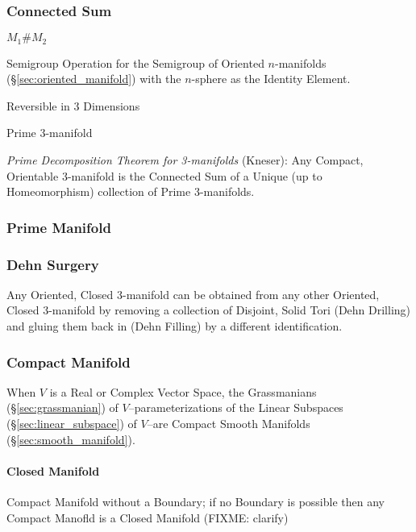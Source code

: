\subsubsection{Connected Sum}\label{sec:connected_sum}

$M_1 \# M_2$

Semigroup Operation for the Semigroup of Oriented $n$-manifolds
(\S\ref{sec:oriented_manifold}) with the $n$-sphere as the Identity Element.

Reversible in 3 Dimensions

Prime 3-manifold

\emph{Prime Decomposition Theorem for 3-manifolds} (Kneser): Any Compact,
Orientable 3-manifold is the Connected Sum of a Unique (up to Homeomorphism)
collection of Prime 3-manifolds.



\subsubsection{Prime Manifold}\label{sec:prime_manifold}

\subsubsection{Dehn Surgery}\label{sec:dehn_surgery}

Any Oriented, Closed 3-manifold can be obtained from any other
Oriented, Closed 3-manifold by removing a collection of Disjoint,
Solid Tori (Dehn Drilling) and gluing them back in (Dehn Filling) by a
different identification.



\subsubsection{Compact Manifold}\label{sec:compact_manifold}

When $V$ is a Real or Complex Vector Space, the Grassmanians
(\S\ref{sec:grassmanian}) of $V$--parameterizations of the Linear Subspaces
(\S\ref{sec:linear_subspace}) of $V$--are Compact Smooth Manifolds
(\S\ref{sec:smooth_manifold}).



\paragraph{Closed Manifold}\label{sec:closed_manifold}\hfill

Compact Manifold without a Boundary; if no Boundary is possible then any
Compact Manofld is a Closed Manifold (FIXME: clarify)

